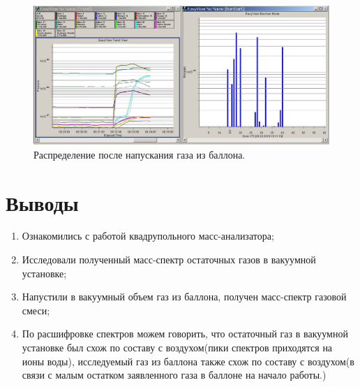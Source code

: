 \documentclass[a4paper, 12pt]{article}
\begin{document}
\begin{enumerate}
		\begin{figure}
			\centering
			\includegraphics[scale=0.5]{2018-03-30_101140.jpg}
			\caption{Распределение после напускания газа из баллона.}
			\label{with_gas}
		\end{figure}
	\end{enumerate}
	\newpage
	\section{Выводы}
	\begin{enumerate}
		\item Ознакомились с работой квадрупольного масс-анализатора;
		\item Исследовали полученный масс-спектр остаточных газов в вакуумной установке;
		\item Напустили в вакуумный объем газ из баллона, получен масс-спектр газовой смеси;
		\item По расшифровке спектров можем говорить, что остаточный газ в вакуумной установке был схож по составу с воздухом(пики спектров приходятся на ионы воды),  исследуемый газ из баллона также схож по составу с воздухом(в связи с малым остатком заявленного газа в баллоне на начало работы.)
	\end{enumerate}
\end{document}
